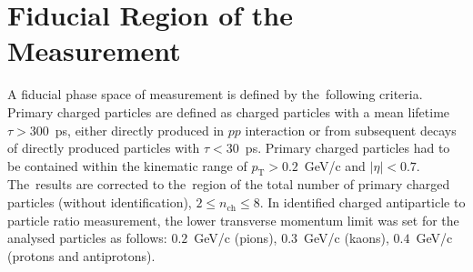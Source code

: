 \section{Fiducial Region of the Measurement}\label{section:star_fiducial}
A fiducial phase space of measurement  is defined by the~following criteria. Primary charged particles are defined as charged particles with a mean lifetime $\tau >300$~ps, either directly produced in $pp$ interaction or from subsequent decays of directly produced particles with $\tau <30$~ps. Primary charged particles had to be contained within the kinematic range of $p_\textrm{T}>0.2$~GeV/c and $|\eta|<0.7$.
The~results are corrected to the~region of the total number of primary charged particles (without identification), $2\leq n_\textrm{ch} \leq 8$.  In identified charged antiparticle to particle ratio measurement, the lower transverse momentum limit was set for the analysed particles as follows: $0.2$~GeV/c (pions), $0.3$~GeV/c (kaons), $0.4$~GeV/c (protons and antiprotons).





